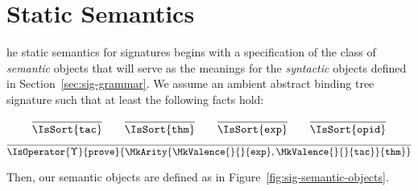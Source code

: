 \section{Static Semantics}
\label{sec:sig-statics}

\newcommand\SemSym{\mathrm{Sym}}
\newcommand\SemMetavar{\mathrm{Metavar}}
\newcommand\SemOpid{\mathrm{Opid}}
\newcommand\SemSig{\mathrm{Sig}}
\newcommand\SemParams{\mathrm{Params}}
\newcommand\SemArgs{\mathrm{Args}}
\newcommand\SemTerm[3]{\mathrm{Tm}(#1,#2,#3)}
\newcommand\SemSort{\mathrm{Sort}}
\newcommand\SemValence{\mathrm{Valence}}
\newcommand\SemDecl{\mathrm{Decl}}
\newcommand\Partial[2]{#1\rightharpoonup #2}
\newcommand\FinArr[2]{#1\xrightarrow{\mathrm{fin}} #2}

\newcommand\SemExprs{\mathbf{E}}
\newcommand\AbtSortTac{\mathtt{tac}}
\newcommand\AbtSortThm{\mathtt{thm}}
\newcommand\AbtSortExp{\mathtt{exp}}
\newcommand\AbtSortOpid{\mathtt{opid}}
\newcommand\OpProve{\mathtt{prove}}

\newcommand\OpCust

The static semantics for \RedPRL{} signatures begins with a specification of
the class of \emph{semantic} objects that will serve as the meanings for the
\emph{syntactic} objects defined in Section~\ref{sec:sig-grammar}. We assume an
ambient abstract binding tree signature such that at least the following facts
hold:

\[
  \infer{
    \IsSort{\AbtSortTac}
  }{
  }
  \qquad
  \infer{
    \IsSort{\AbtSortThm}
  }{
  }
  \qquad
  \infer{
    \IsSort{\AbtSortExp}
  }{
  }
  \qquad
  \infer{
    \IsSort{\AbtSortOpid}
  }{
  }
\]
\[
  \infer{
    \IsOperator{\Upsilon}{\OpProve}{
      \MkArity{
        \MkValence{}{}{\AbtSortExp},
        \MkValence{}{}{\AbtSortTac}
      }{\AbtSortThm}
    }
  }{
  }
\]

Then, our semantic objects are defined as in Figure~\ref{fig:sig-semantic-objects}.

